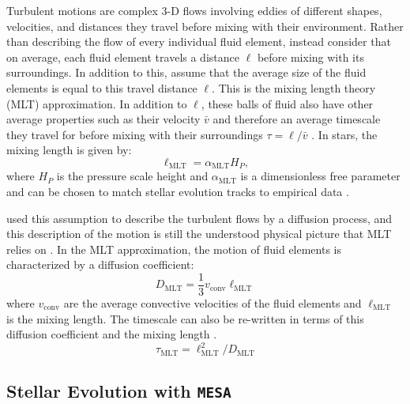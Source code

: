 Turbulent motions are complex 3-D flows involving eddies of different shapes, velocities, and distances they travel before mixing with their environment.
Rather than describing the flow of every individual fluid element, instead consider that on average, each fluid element travels a distance $\ell$ before mixing with its surroundings.
In addition to this, assume that the average size of the fluid elements is equal to this travel distance $\ell$.
This is the mixing length theory (MLT) approximation.
In addition to $\ell$, these balls of fluid also have other average properties such as their velocity $\bar{v}$ and therefore an average timescale they travel for before mixing with their surroundings $\tau=\ell/\bar{v}$ \citep{kippenhahnStellarStructureEvolution2013,coxPrinciplesStellarStructure1968,joyceReviewMixingLength2023}.
In stars, the mixing length is given by:
\begin{equation}
\ell_{\mathrm{MLT}} = \alpha_{\text{MLT}} H_P,
\end{equation}
where $H_P$ is the pressure scale height and $\alpha_{\mathrm{ MLT}}$ is a dimensionless free parameter and can be chosen to match stellar evolution tracks to empirical data \citep{joyceReviewMixingLength2023}.

\cite{prandtl7BerichtUber1925} used this assumption to describe the turbulent flows by a diffusion process, and this description of the motion is still the understood physical picture that MLT relies on \citep{joyceReviewMixingLength2023}.
In the MLT approximation, the motion of fluid elements is characterized by a diffusion coefficient:
\begin{equation}\label{eq:d_mlt}
    D_{\mathrm{MLT}} = \frac{1}{3}v_{\mathrm{conv}}\ell_{\mathrm{MLT}}
\end{equation}
where $v_{\mathrm{conv}}$ are the average convective velocities of the fluid elements and $\ell_{\mathrm{MLT}}$ is the mixing length.
The timescale can also be re-written in terms of this diffusion coefficient and the mixing length \citep{herwigCONVECTIVEREACTIVEPROTON2011}.
\begin{equation}\label{eq:t_mlt}
    \tau_{\mathrm{MLT}} = \ell_{\mathrm{MLT}}^2/D_{\mathrm{MLT}}
\end{equation}

\subsection{Stellar Evolution with \texttt{MESA}}

